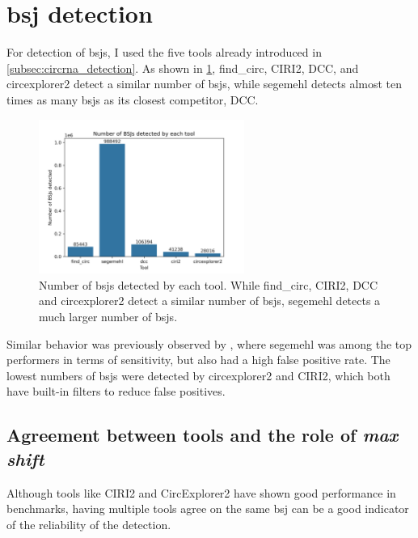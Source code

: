 \section{\Acrfull{bsj} detection}

For detection of \gls{bsj}s, I used the five tools already introduced in
\cref{subsec:circrna_detection}.
As shown in \cref{fig:detection_bars}, find\_circ, CIRI2, DCC, and
circexplorer2 detect a similar number of \gls{bsj}s, while segemehl detects
almost ten times as many \gls{bsj}s as its closest competitor, DCC.

\begin{figure}[H] \centering

    \includegraphics[width=0.6\textwidth]{chapters/4_results_and_discussion/figures/detection/n_bsjs_detected.png}
    \caption{Number of \gls{bsj}s detected by each tool.
        While find\_circ, CIRI2, DCC and circexplorer2 detect a similar number of
        \gls{bsj}s, segemehl detects a much larger number of \gls{bsj}s.
    }
    \label{fig:detection_bars}
\end{figure}
Similar behavior was previously observed by \textcite{zeng_comprehensive_2017},
where segemehl was among the top performers in terms of sensitivity, but also
had a high false positive rate.
The lowest numbers of \gls{bsj}s were detected by circexplorer2 and CIRI2,
which both have built-in filters to reduce false
positives\supercite{zhang_diverse_2016,gao_circular_2018}.

\subsection{Agreement between tools and the role of \textit{max shift}}

Although tools like CIRI2 and CircExplorer2 have shown good performance in
benchmarks, having multiple tools agree on the same \gls{bsj} can be a good
indicator of the reliability of the detection.

